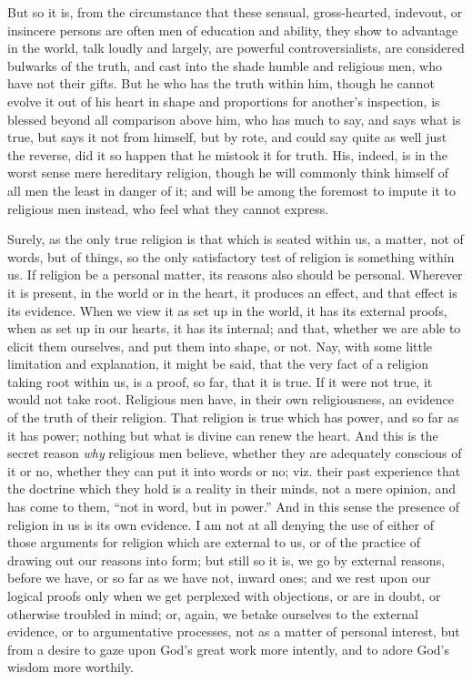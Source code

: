 But so it is, from the circumstance that these sensual,
gross-hearted, indevout, or insincere persons are often men of
education and ability, they show to advantage in the world, talk
loudly and largely, are powerful controversialists, are considered
bulwarks of the truth, and cast into the shade humble and religious
men, who have not their gifts. But he who has the truth within him,
though he cannot evolve it out of his heart in shape and proportions
for another's inspection, is blessed beyond all comparison above him,
who has much to say, and says what is true, but says it not from
himself, but by rote, and could say quite as well just the reverse,
did it so happen that he mistook it for truth. His, indeed, is in the
worst sense mere hereditary religion, though he will commonly think
himself of all men the least in danger of it; and will be among the
foremost to impute it to religious men instead, who feel what they
cannot express.

Surely, as the only true religion is that which is seated within
us, a matter, not of words, but of things, so the only satisfactory
test of religion is something within us. If religion be a personal
matter, its reasons also should be personal. Wherever it is present,
in the world or in the heart, it produces an effect, and that effect
is its evidence. When we view it as set up in the world, it has its
external proofs, when as set up in our hearts, it has its internal;
and that, whether we are able to elicit them ourselves, and put them
into shape, or not. Nay, with some little limitation and explanation,
it might be said, that the very fact of a religion taking root within
us, is a proof, so far, that it is true. If it were not true, it would
not take root. Religious men have, in their own religiousness, an
evidence of the truth of their religion. That religion is true which
has power, and so far as it has power; nothing but what is divine can
renew the heart. And this is the secret reason \emph{why} religious
men believe, whether they are adequately conscious of it or no,
whether they can put it into words or no; viz. their past experience
that the doctrine which they hold is a reality in their minds, not a
mere opinion, and has come to them, ``not in word, but in
power.'' And in this sense the presence of religion in us is its
own evidence. I am not at all denying the use of either of those
arguments for religion which are external to us, or of the practice of
drawing out our reasons into form; but still so it is, we go by
external reasons, before we have, or so far as we have not, inward
ones; and we rest upon our logical proofs only when we get perplexed
with objections, or are in doubt, or otherwise troubled in mind; or,
again, we betake ourselves to the external evidence, or to
argumentative processes, not as a matter of personal interest, but
from a desire to gaze upon God's great work more intently, and to
adore God's wisdom more worthily.

